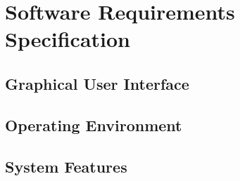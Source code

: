 \section{ Software Requirements Specification }
\subsection{ Graphical User Interface }
\subsection{ Operating Environment }
\subsection{ System Features }